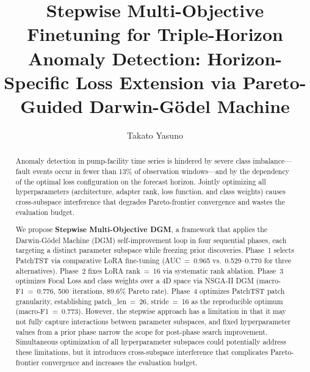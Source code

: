 ﻿\documentclass[twocolumn]{article}
\title{Stepwise Multi-Objective Finetuning for Triple-Horizon Anomaly Detection:
Horizon-Specific Loss Extension via Pareto-Guided Darwin-G\"{o}del Machine}
\author[1]{Takato Yasuno}
\date{}
\begin{document}
\renewcommand{\abstractname}{Abstract}
\renewcommand{\refname}{References}
\renewcommand{\figurename}{Figure}
\renewcommand{\tablename}{Table}

\maketitle

\begin{abstract}

Anomaly detection in pump-facility time series is hindered by severe
class imbalance---fault events occur in fewer than 13\% of observation
windows---and by the dependency of the optimal loss configuration on
the forecast horizon.
Jointly optimizing all hyperparameters (architecture, adapter rank,
loss function, and class weights) causes cross-subspace interference
that degrades Pareto-frontier convergence and wastes the evaluation budget.

We propose \textbf{Stepwise Multi-Objective DGM}, a framework that
applies the Darwin-G\"{o}del Machine (DGM)
self-improvement loop in four sequential phases,
each targeting a distinct parameter subspace while freezing prior discoveries.
Phase~1 selects PatchTST via comparative
LoRA fine-tuning
(AUC~=~0.965 vs.\ 0.529--0.770 for three alternatives).
Phase~2 fixes LoRA rank~=~16 via systematic rank ablation.
Phase~3 optimizes Focal Loss and class weights
over a 4D space via NSGA-II DGM (macro-F1~=~0.776,
500~iterations, 89.6\% Pareto rate).
Phase~4 optimizes PatchTST patch granularity, establishing
patch\_len~=~26, stride~=~16 as the reproducible optimum
(macro-F1~=~0.773).
However, the stepwise approach has a limitation in that it may not fully capture interactions between parameter subspaces,
and fixed hyperparameter values from a prior phase narrow the scope for post-phase search improvement.
Simultaneous optimization of all hyperparameter subspaces could potentially address these limitations, 
but it introduces cross-subspace interference that complicates Pareto-frontier convergence 
and increases the evaluation budget.


\end{abstract}
\end{document}
